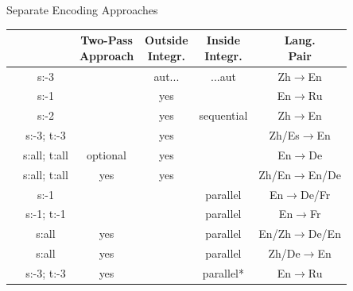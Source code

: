 \begin{frame}{Separate Encoding Approaches}\label{slide:separateencoding}
	\begin{table}
		\begin{tabular}{ *{5}{c|} c }

			\thead{Reference}
			& \thead{Context}
					& \thead{Two-Pass\\ Approach}
						& \thead{Outside\\ Integr.}
							& \thead{Inside\\ Integr.}
								& \thead{Lang.\\ Pair}
									 \\
			\hline\hline
			\cite{wang_exploiting_2017}&s:-3 &&aut...&...aut&Zh$\to$En\\
			\hline
			\cite{voita_context-aware_2018}&s:-1&&yes&&En$\to$Ru\\
			\hline
			\cite{zhang_improving_2018}&s:-2&&yes&sequential&Zh$\to$En\\
			\hline
			\cite{miculicich_document-level_2018}&s:-3; t:-3&&yes&&Zh/Es$\to$En\\
			\hline
			\cite{maruf_selective_2019}&s:all; t:all&optional&yes&&En$\to$De\\
			\hline
			\cite{zheng_toward_2020}&s:all; t:all&yes&yes&&Zh/En$\to$En/De\\
			\hline
			\cite{jean_does_2017}&s:-1&&&parallel&En$\to$De/Fr\\
			\hline
			\cite{bawden_evaluating_2018}&s:-1; t:-1&&&parallel&En$\to$Fr\\
			\hline
			\cite{fu_reference_2019}&s:all&yes&&parallel&En/Zh$\to$De/En\\
			\hline
			\cite{tan_hierarchical_2019}&s:all&yes&&parallel&Zh/De$\to$En\\
			\hline
			\cite{voita_when_2019}&s:-3; t:-3&yes&&parallel*&En$\to$Ru\\
			\hline
		\end{tabular}
	\end{table}
\end{frame}

